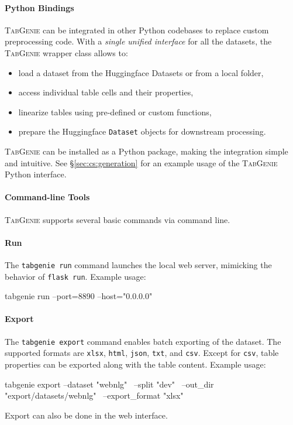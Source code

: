 \paragraph{Python Bindings}
\textsc{TabGenie} can be integrated in other Python codebases to replace custom preprocessing code. With a \textit{single unified interface} for all the datasets, the \textsc{TabGenie} wrapper class allows to:
\begin{itemize}
    \item load a dataset from the Huggingface Datasets or from a local folder,
    \item access individual table cells and their properties,
    \item linearize tables using pre-defined or custom functions,
    \item prepare the Huggingface \texttt{Dataset} objects for downstream processing.
\end{itemize}
\textsc{TabGenie} can be installed as a Python package, making the integration simple and intuitive.
See §\ref{sec:cs:generation} for an example usage of the \textsc{TabGenie} Python interface.


\paragraph{Command-line Tools}
\textsc{TabGenie} supports several basic commands via command line.

\paragraph{Run} The \texttt{tabgenie run} command launches the local web server, mimicking the behavior of \texttt{flask run}. Example usage:

\begin{python}
    tabgenie run --port=8890 --host="0.0.0.0"
\end{python}

\paragraph{Export} The \texttt{tabgenie export} command enables batch exporting of the dataset. The supported formats are \texttt{xlsx}, \texttt{html}, \texttt{json}, \texttt{txt}, and \texttt{csv}. Except for \texttt{csv}, table properties can be exported along with the table content. Example usage:

\begin{python}
    tabgenie export --dataset "webnlg" \
    --split "dev" \
    --out_dir "export/datasets/webnlg" \
    --export_format "xlsx"
\end{python}
\noindent Export can also be done in the web interface.

